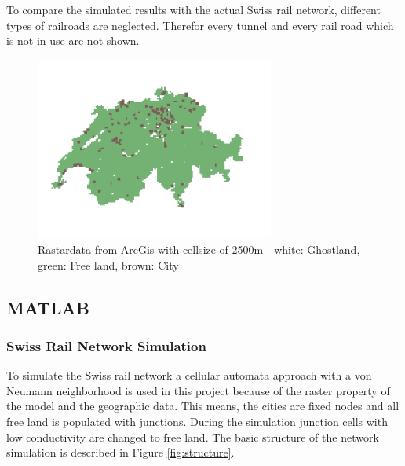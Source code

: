 \documentclass[11pt]{scrartcl}
\begin{document}
To compare the simulated results with the actual Swiss rail network, different types of railroads are neglected. Therefor every tunnel and every rail road which is not in use are not shown.



\begin{figure}[H]
	\centering
	\includegraphics[width=0.7\textwidth]{figures/map_2500_cities}
	\caption{Rastardata from ArcGis with cellsize of 2500m - white: Ghostland, green: Free land, brown: City}
	\label{fig:map_cities}
\end{figure}

\pagebreak
\subsection{MATLAB}

\subsubsection{Swiss Rail Network Simulation}

To simulate the Swiss rail network a cellular automata approach with a von Neumann neighborhood is used in this project because of the raster property of the model and the geographic data. This means, the cities are fixed nodes and all free land is populated with junctions. During the simulation junction cells with low conductivity are changed to free land. The basic structure of the network simulation is described in Figure \ref{fig:structure}.
\end{document}

